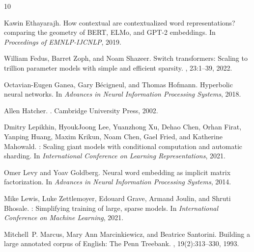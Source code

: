 \documentclass[10pt,letterpaper]{article}
\begin{document}
\begin{thebibliography}{10}

Kawin Ethayarajh.
\newblock How contextual are contextualized word representations? comparing the geometry of {BERT}, {ELMo}, and {GPT-2} embeddings.
\newblock In {\em Proceedings of EMNLP-IJCNLP}, 2019.

William Fedus, Barret Zoph, and Noam Shazeer.
\newblock Switch transformers: Scaling to trillion parameter models with simple and efficient sparsity.
, 23:1--39, 2022.

Octavian-Eugen Ganea, Gary B{\'e}cigneul, and Thomas Hofmann.
\newblock Hyperbolic neural networks.
\newblock In {\em Advances in Neural Information Processing Systems}, 2018.

Allen Hatcher.
.
\newblock Cambridge University Press, 2002.

Dmitry Lepikhin, HyoukJoong Lee, Yuanzhong Xu, Dehao Chen, Orhan Firat, Yanping Huang, Maxim Krikun, Noam Chen, Gael Fried, and Katherine Mahowald.
: Scaling giant models with conditional computation and automatic sharding.
\newblock In {\em International Conference on Learning Representations}, 2021.

Omer Levy and Yoav Goldberg.
\newblock Neural word embedding as implicit matrix factorization.
\newblock In {\em Advances in Neural Information Processing Systems}, 2014.

Mike Lewis, Luke Zettlemoyer, Edouard Grave, Armand Joulin, and Shruti Bhosale.
: Simplifying training of large, sparse models.
\newblock In {\em International Conference on Machine Learning}, 2021.

Mitchell~P. Marcus, Mary Ann Marcinkiewicz, and Beatrice Santorini.
\newblock Building a large annotated corpus of {English}: The {Penn Treebank}.
, 19(2):313--330, 1993.


\end{thebibliography}
\end{document}
